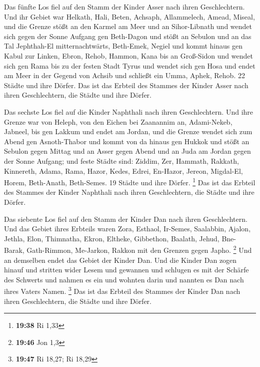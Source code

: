  Das fünfte Los fiel auf den Stamm der Kinder Asser nach
ihren Geschlechtern.  Und ihr Gebiet war Helkath, Hali,
Beten, Achsaph,  Allammelech, Amead, Miseal, und die
Grenze stößt an den Karmel am Meer und an Sihor-Libnath 
und wendet sich gegen der Sonne Aufgang gen Beth-Dagon und stößt an
Sebulon und an das Tal Jephthah-El mitternachtwärts, Beth-Emek, Negiel
und kommt hinaus gen Kabul zur Linken,  Ebron, Rehob,
Hammon, Kana bis an Groß-Sidon  und wendet sich gen Rama
bis zu der festen Stadt Tyrus und wendet sich gen Hosa und endet am Meer
in der Gegend von Achsib  und schließt ein Umma, Aphek,
Rehob. 22 Städte und ihre Dörfer.  Das ist das Erbteil
des Stammes der Kinder Asser nach ihren Geschlechtern, die Städte und
ihre Dörfer.

 Das sechste Los fiel auf die Kinder Naphthali nach ihren
Geschlechtern.  Und ihre Grenze war von Heleph, von den
Eichen bei Zaanannim an, Adami-Nekeb, Jabneel, bis gen Lakkum und endet
am Jordan,  und die Grenze wendet sich zum Abend gen
Asnoth-Thabor und kommt von da hinaus gen Hukkok und stößt an Sebulon
gegen Mittag und an Asser gegen Abend und an Juda am Jordan gegen der
Sonne Aufgang;  und feste Städte sind: Ziddim, Zer,
Hammath, Rakkath, Kinnereth,  Adama, Rama, Hazor,
 Kedes, Edrei, En-Hazor,  Jereon,
Migdal-El, Horem, Beth-Anath, Beth-Semes. 19 Städte und ihre Dörfer.
\footnote{\textbf{19:38} Ri 1,33}  Das ist das Erbteil
des Stammes der Kinder Naphthali nach ihren Geschlechtern, die Städte
und ihre Dörfer.

 Das siebente Los fiel auf den Stamm der Kinder Dan nach
ihren Geschlechtern.  Und das Gebiet ihres Erbteils waren
Zora, Esthaol, Ir-Semes,  Saalabbin, Ajalon, Jethla,
 Elon, Thimnatha, Ekron,  Eltheke,
Gibbethon, Baalath,  Jehud, Bne-Barak, Gath-Rimmon,
 Me-Jarkon, Rakkon mit den Grenzen gegen Japho.
\footnote{\textbf{19:46} Jon 1,3}  Und an demselben endet
das Gebiet der Kinder Dan. Und die Kinder Dan zogen hinauf und stritten
wider Lesem und gewannen und schlugen es mit der Schärfe des Schwerts
und nahmen es ein und wohnten darin und nannten es Dan nach ihres Vaters
Namen. \footnote{\textbf{19:47} Ri 18,27; Ri 18,29}  Das
ist das Erbteil des Stammes der Kinder Dan nach ihren Geschlechtern, die
Städte und ihre Dörfer.

